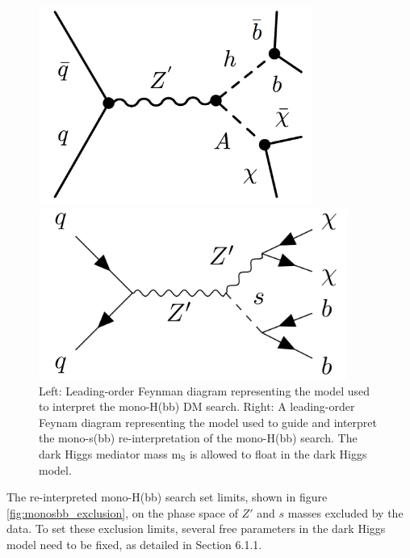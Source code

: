 \documentclass[12pt]{article}
\begin{document}
\begin{figure}[H]
	\centering
	\begin{minipage}[b]{0.45\textwidth}
	\includegraphics[width=0.8\textwidth]{figures/monohbb}
	\end{minipage}
	\begin{minipage}[b]{0.45\textwidth}
	\includegraphics[width=0.9\textwidth]{figures/monosbb}
	\end{minipage}
	\caption[]{Left: Leading-order Feynman diagram representing the model used to interpret the mono-H(bb) DM search. Right: A leading-order Feynam diagram representing the model used to guide and interpret the mono-s(bb) re-interpretation of the mono-H(bb) search. The dark Higgs mediator mass m$_\text{S}$ is allowed to float in the dark Higgs model.}
	\label{fig:monohbbreinterp}
\end{figure}

The re-interpreted mono-H(bb) search set limits, shown in figure \ref{fig:monosbb_exclusion}, on the phase space of $Z'$ and $s$ masses excluded by the data. To set these exclusion limits, several free parameters in the dark Higgs model need to be fixed, as detailed in Section 6.1.1.
%
\end{document}

